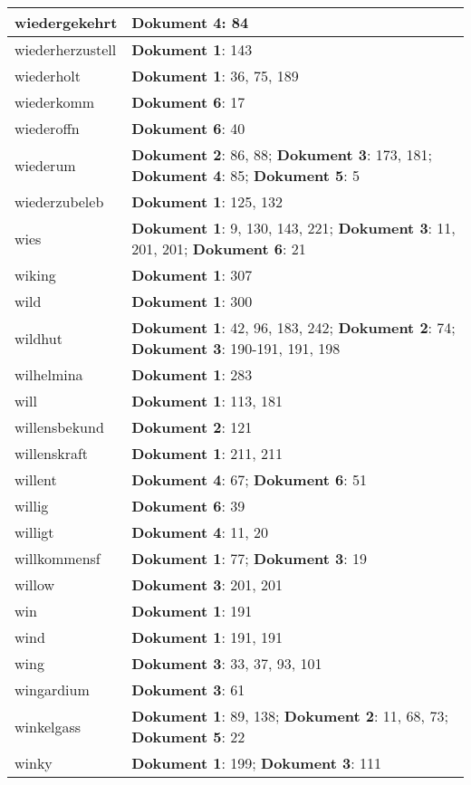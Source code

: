 \documentclass[a5paper]{article}
\begin{document}
\begin{longtable}[l]{|l|p{3in}|}
\hline
wiedergekehrt & \textbf{Dokument 4}: 84 \\
\hline
wiederherzustell & \textbf{Dokument 1}: 143 \\
\hline
wiederholt & \textbf{Dokument 1}: 36, 75, 189 \\
\hline
wiederkomm & \textbf{Dokument 6}: 17 \\
\hline
wiederoffn & \textbf{Dokument 6}: 40 \\
\hline
wiederum & \textbf{Dokument 2}: 86, 88; \textbf{Dokument 3}: 173, 181; \textbf{Dokument 4}: 85; \textbf{Dokument 5}: 5 \\
\hline
wiederzubeleb & \textbf{Dokument 1}: 125, 132 \\
\hline
wies & \textbf{Dokument 1}: 9, 130, 143, 221; \textbf{Dokument 3}: 11, 201, 201; \textbf{Dokument 6}: 21 \\
\hline
wiking & \textbf{Dokument 1}: 307 \\
\hline
wild & \textbf{Dokument 1}: 300 \\
\hline
wildhut & \textbf{Dokument 1}: 42, 96, 183, 242; \textbf{Dokument 2}: 74; \textbf{Dokument 3}: 190-191, 191, 198 \\
\hline
wilhelmina & \textbf{Dokument 1}: 283 \\
\hline
will & \textbf{Dokument 1}: 113, 181 \\
\hline
willensbekund & \textbf{Dokument 2}: 121 \\
\hline
willenskraft & \textbf{Dokument 1}: 211, 211 \\
\hline
willent & \textbf{Dokument 4}: 67; \textbf{Dokument 6}: 51 \\
\hline
willig & \textbf{Dokument 6}: 39 \\
\hline
willigt & \textbf{Dokument 4}: 11, 20 \\
\hline
willkommensf & \textbf{Dokument 1}: 77; \textbf{Dokument 3}: 19 \\
\hline
willow & \textbf{Dokument 3}: 201, 201 \\
\hline
win & \textbf{Dokument 1}: 191 \\
\hline
wind & \textbf{Dokument 1}: 191, 191 \\
\hline
wing & \textbf{Dokument 3}: 33, 37, 93, 101 \\
\hline
wingardium & \textbf{Dokument 3}: 61 \\
\hline
winkelgass & \textbf{Dokument 1}: 89, 138; \textbf{Dokument 2}: 11, 68, 73; \textbf{Dokument 5}: 22 \\
\hline
winky & \textbf{Dokument 1}: 199; \textbf{Dokument 3}: 111 \\

\end{longtable}
\end{document}
